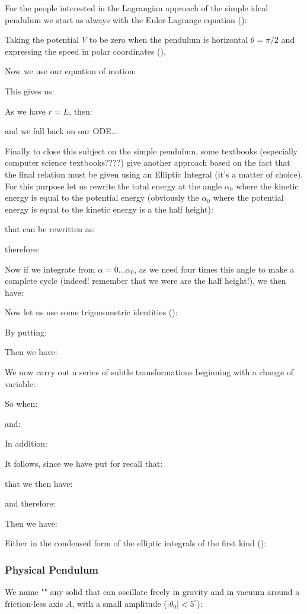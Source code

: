 	For the people interested in the Lagrangian approach of the simple ideal pendulum we start as always with the Euler-Lagrange equation ():
	
	Taking the potential $V$ to be zero when the pendulum is horizontal $\theta=\pi/2$ and expressing the speed in polar coordinates ().

	Now we use our equation of motion:
	
	This gives us:
	
	As we have $r=L$, then:
	
	and we fall back on our ODE...
	
	Finally to close this subject on the simple pendulum, some textbooks (especially computer science textbooks????) give another approach based on the fact that the final relation must be given using an Elliptic Integral (it's a matter of choice). For this purpose let us rewrite the total energy at the angle $\alpha_0$ where the kinetic energy is equal to the potential energy (obviously the $\alpha_0$ where the potential energy is equal to the kinetic energy is a the half height):
	
	that can be rewritten as:
	
	therefore:
	
	Now if we integrate from $\alpha=0...\alpha_0$, as we need four times this angle to make a complete cycle (indeed! remember that we were are the half height!), we then have:
	
	Now let us use some trigonometric identities ():
	
	By putting:
	
	Then we have:
	
	We now carry out a series of subtle transformations beginning with a change of variable:
	
	So when:
	
	and:
	
 	In addition:
	
 	It follows, since we have put for recall that:
	
	that we then have:
	
	and therefore:
 	
	Then we have:
	
	Either in the condensed form of the elliptic integrals of the first kind ():
	
	
	\pagebreak
	\subsubsection{Physical Pendulum}
	We name "" any solid that can oscillate freely in gravity and in vacuum around a friction-less axis $A$, with a small amplitude ($|\theta_0| < 5^\circ$):
	
